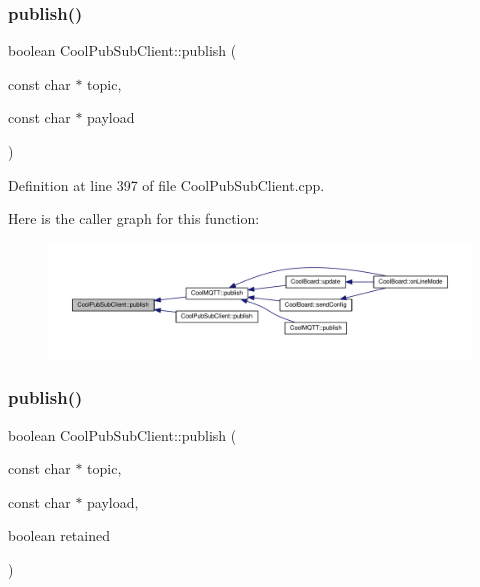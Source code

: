 \subsubsection{\texorpdfstring{publish()}{publish()}\hspace{0.1cm}{\footnotesize\ttfamily [1/4]}}
{\footnotesize\ttfamily boolean Cool\+Pub\+Sub\+Client\+::publish (\begin{DoxyParamCaption}\item[{const char $\ast$}]{topic,  }\item[{const char $\ast$}]{payload }\end{DoxyParamCaption})}



Definition at line 397 of file Cool\+Pub\+Sub\+Client.\+cpp.

Here is the caller graph for this function\+:
\nopagebreak
\begin{figure}[H]
\begin{center}
\leavevmode
\includegraphics[width=350pt]{class_cool_pub_sub_client_ab6ad5fa2d3db8f91454027257f225a89_icgraph}
\end{center}
\end{figure}
\mbox{\label{class_cool_pub_sub_client_a0b01cef98af0b57d8da4df373e196448}} 
\subsubsection{\texorpdfstring{publish()}{publish()}\hspace{0.1cm}{\footnotesize\ttfamily [2/4]}}
{\footnotesize\ttfamily boolean Cool\+Pub\+Sub\+Client\+::publish (\begin{DoxyParamCaption}\item[{const char $\ast$}]{topic,  }\item[{const char $\ast$}]{payload,  }\item[{boolean}]{retained }\end{DoxyParamCaption})}



